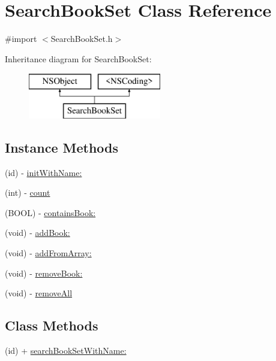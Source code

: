 \hypertarget{interface_search_book_set}{\section{Search\-Book\-Set Class Reference}
\label{interface_search_book_set}
}


{\ttfamily \#import $<$Search\-Book\-Set.\-h$>$}

Inheritance diagram for Search\-Book\-Set\-:\begin{figure}[H]
\begin{center}
\leavevmode
\includegraphics[height=2.000000cm]{interface_search_book_set}
\end{center}
\end{figure}
\subsection*{Instance Methods}
\begin{DoxyCompactItemize}
\item 
(id) -\/ \hyperlink{interface_search_book_set_a687b1bb22908922ae1e4a8261ef86af3}{init\-With\-Name\-:}
\item 
(int) -\/ \hyperlink{interface_search_book_set_a9ba94da7db769b98d02381d872dd9bbb}{count}
\item 
(B\-O\-O\-L) -\/ \hyperlink{interface_search_book_set_a5ab6ac0eb2213bca8d449321cf74e725}{contains\-Book\-:}
\item 
(void) -\/ \hyperlink{interface_search_book_set_afa278319f6bcaaab47ff4f8ff5b0815b}{add\-Book\-:}
\item 
(void) -\/ \hyperlink{interface_search_book_set_a5da2a60826f327074cd4307a78c02b56}{add\-From\-Array\-:}
\item 
(void) -\/ \hyperlink{interface_search_book_set_a421c46b3c2afdf6320aa8f23b358166b}{remove\-Book\-:}
\item 
(void) -\/ \hyperlink{interface_search_book_set_a9b0a5a3ad9972ab0e8eb0b54873aac6b}{remove\-All}
\end{DoxyCompactItemize}
\subsection*{Class Methods}
\begin{DoxyCompactItemize}
\item 
(id) + \hyperlink{interface_search_book_set_ac89bd5a7d6fa417029fe2429a73f025f}{search\-Book\-Set\-With\-Name\-:}
\end{DoxyCompactItemize}
